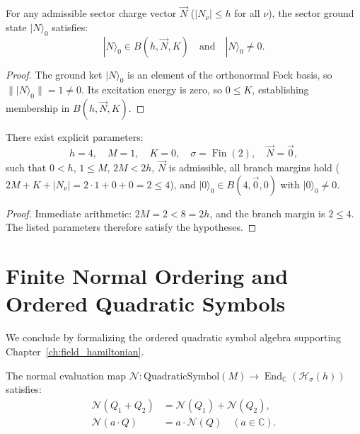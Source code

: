 \begin{lemma}
\label{lem:app_admissible_ground_nonzero}
For any admissible sector charge vector $\vec{N}$ ($|N_\nu| \le h$ for all $\nu$), the sector ground state $|N\rangle_0$ satisfies:
\begin{equation}
|N\rangle_0 \in B(h, \vec{N}, K) \quad \text{and} \quad |N\rangle_0 \neq 0.
\end{equation}
\end{lemma}

\begin{proof}
The ground ket $|N\rangle_0$ is an element of the orthonormal Fock basis, so $\||N\rangle_0\| = 1 \neq 0$. Its excitation energy is zero, so $0 \le K$, establishing membership in $B(h, \vec{N}, K)$.
\end{proof}

\begin{proposition}
\label{prop:concrete_two_branch_parameters}
There exist explicit parameters:
\begin{equation}
h = 4, \quad M = 1, \quad K = 0, \quad \sigma = \operatorname{Fin}(2), \quad \vec{N} = \vec{0},
\end{equation}
such that $0 < h$, $1 \le M$, $2M < 2h$, $\vec{N}$ is admissible, all branch margins hold ($2M + K + |N_\nu| = 2 \cdot 1 + 0 + 0 = 2 \le 4$), and $|0\rangle_0 \in B(4, \vec{0}, 0)$ with $|0\rangle_0 \neq 0$.
\end{proposition}

\begin{proof}
Immediate arithmetic: $2M = 2 < 8 = 2h$, and the branch margin is
$2\le4$. The listed parameters therefore satisfy the hypotheses.
\end{proof}

\section{Finite Normal Ordering and Ordered Quadratic Symbols}

We conclude by formalizing the ordered quadratic symbol algebra supporting Chapter~\ref{ch:field_hamiltonian}.

\begin{lemma}
\label{lem:app_normal_eval_linear}
The normal evaluation map $\mathcal{N} : \mathrm{QuadraticSymbol}(M) \to \operatorname{End}_{\mathbb{C}}(\mathcal{H}_\sigma(h))$ satisfies:
\begin{align}
\mathcal{N}(Q_1 + Q_2) &= \mathcal{N}(Q_1) + \mathcal{N}(Q_2), \\
\mathcal{N}(a \cdot Q) &= a \cdot \mathcal{N}(Q) \quad (a \in \mathbb{C}).
\end{align}
\end{lemma}

